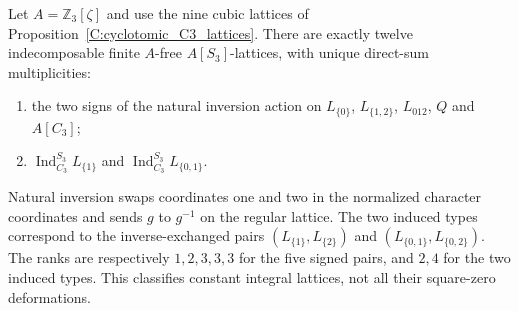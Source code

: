 \begin{proposition}
\label{C:cyclotomic_S3_lattices}
Let $A=\mathbb Z_3[\zeta]$ and use the nine cubic lattices of
Proposition~\ref{C:cyclotomic_C3_lattices}.
There are exactly twelve indecomposable finite $A$-free
$A[S_3]$-lattices, with unique direct-sum multiplicities:
\begin{enumerate}
\item the two signs of the natural inversion action on
$L_{\{0\}}$, $L_{\{1,2\}}$, $L_{012}$, $Q$ and $A[C_3]$;
\item $\operatorname{Ind}_{C_3}^{S_3}L_{\{1\}}$ and
$\operatorname{Ind}_{C_3}^{S_3}L_{\{0,1\}}$.
\end{enumerate}
Natural inversion swaps coordinates one and two in the
normalized character coordinates and sends $g$ to $g^{-1}$
on the regular lattice. The two induced types correspond
to the inverse-exchanged pairs
$(L_{\{1\}},L_{\{2\}})$ and
$(L_{\{0,1\}},L_{\{0,2\}})$.
The ranks are respectively $1,2,3,3,3$ for the five signed
pairs, and $2,4$ for the two induced types.
This classifies constant integral lattices, not all their
square-zero deformations.
\end{proposition}

